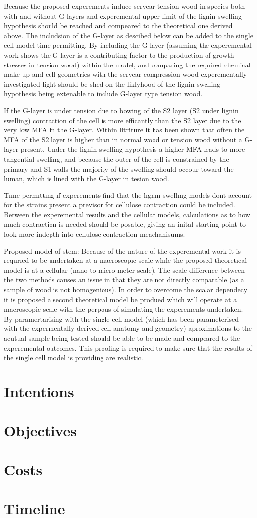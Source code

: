 \documentclass{article}
\begin{document}
Because the proposed experements induce servear tension wood in species both
with and without G-layers and experemental upper limit of the lignin swelling
hypothesis should be reached and compeared to the theoretical one derived above.
The includsion of the G-layer as descibed below can be added to the single cell
model time permitting. By including the G-layer (assuming the experemental work
shows the G-layer is a contributing factor to the production of growth stresses
in tension wood) within the model, and comparing the required chemical make up
and cell geometries with the servear compression wood experementally
investigated light should be shed on the liklyhood of the lignin swelling
hypothesis being extenable to include G-layer type tension wood.

If the G-layer is under tension due to bowing of the S2 layer (S2 under lignin
swelling) contraction of the cell is more efficantly than the S2 layer due to
the very low MFA in the G-layer. Within litriture it has been shown that often the
MFA of the S2 layer is higher than in normal wood or tension wood without a
G-layer present. Under the lignin swelling hypothesis a higher MFA leads to more
tangential swelling, and because the outer of the cell is constrained by the
primary and S1 walls the majority of the swelling should occour toward the
luman, which is lined with the G-layer in tesion wood.

Time permitting if experements find that the lignin swelling models dont account
for the strains present a previsor for cellulose contraction could be included.
Between the experemental results and the cellular models, calculations as to how
much contraction is needed should be posable, giving an inital starting point to
look more indepth into cellulose contraction meachanisums.

Proposed model of stem:
Because of the nature of the experemental work it is requried to be undertaken
at a macroscopic scale while the proposed theoretical model is at a cellular
(nano to micro meter scale). The scale difference between the two methods causes
an issue in that they are not directly comparable (as a sample of wood is not
homogenious). In order to overcome the scalar dependecy it is proposed a second
theoretical model be produed which will operate at a macroscopic scale with the
perpous of simulating the experements undertaken. By paramertarising with the
single cell model (which has been parameterised with the expermentally derived
cell anatomy and geometry) aproximations to the acutual sample being tested
should be able to be made and compeared to the experemental outcomes. This
proofing is required to make sure that the results of the single cell model is
providing are realistic.

\section{Intentions}

\section{Objectives}

\section{Costs}

\section{Timeline}
\end{document}
